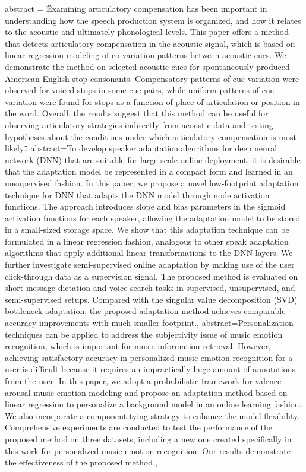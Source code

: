 \documentclass[runningheads,a4paper]{llncs}
\begin{document}
\cite{Alina14detecting}
abstract  = \"Examining articulatory compensation has been important in understanding how the speech production system is organized, and how it relates to the acoustic and ultimately phonological levels. This paper offers a method that detects articulatory compensation in the acoustic signal, which is based on linear regression modeling of co-variation patterns between acoustic cues. We demonstrate the method on selected acoustic cues for spontaneously produced American English stop consonants. Compensatory patterns of cue variation were observed for voiced stops in some cue pairs, while uniform patterns of cue variation were found for stops as a function of place of articulation or position in the word. Overall, the results suggest that this method can be useful for observing articulatory strategies indirectly from acoustic data and testing hypotheses about the conditions under which articulatory compensation is most likely.\".
\cite{Zhao15invest}
abstract={To develop speaker adaptation algorithms for deep neural network (DNN) that are suitable for large-scale online deployment, it is desirable that the adaptation model be represented in a compact form and learned in an unsupervised fashion. In this paper, we propose a novel low-footprint adaptation technique for DNN that adapts the DNN model through node activation functions. The approach introduces slope and bias parameters in the sigmoid activation functions for each speaker, allowing the adaptation model to be stored in a small-sized storage space. We show that this adaptation technique can be formulated in a linear regression fashion, analogous to other speak adaptation algorithms that apply additional linear transformations to the DNN layers. We further investigate semi-supervised online adaptation by making use of the user click-through data as a supervision signal. The proposed method is evaluated on short message dictation and voice search tasks in supervised, unsupervised, and semi-supervised setups. Compared with the singular value decomposition (SVD) bottleneck adaptation, the proposed adaptation method achieves comparable accuracy improvements with much smaller footprint.}, 
\cite{chen14linear}
abstract={Personalization techniques can be applied to address the subjectivity issue of music emotion recognition, which is important for music information retrieval. However, achieving satisfactory accuracy in personalized music emotion recognition for a user is difficult because it requires an impractically huge amount of annotations from the user. In this paper, we adopt a probabilistic framework for valence-arousal music emotion modeling and propose an adaptation method based on linear regression to personalize a background model in an online learning fashion. We also incorporate a component-tying strategy to enhance the model flexibility. Comprehensive experiments are conducted to test the performance of the proposed method on three datasets, including a new one created specifically in this work for personalized music emotion recognition. Our results demonstrate the effectiveness of the proposed method.}, 
\end{document}
